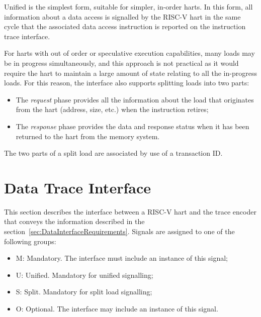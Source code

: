 Unified is the simplest form, suitable for simpler, in-order harts.  In this form, all
information about a data access is signalled by the RISC-V hart in the
same cycle that the associated data access instruction is reported on the instruction
trace interface.  

For harts with out of order or speculative execution capabilities, many loads may be in 
progress simultaneously, and this approach is not practical as it would require the hart 
to maintain a large amount of state relating to all the in-progress loads.  For this 
reason, the interface also supports splitting loads into two parts:

\begin{itemize}
  \item The \textit{request} phase provides all the information about the load that
    originates from the hart (address, size, etc.) when the instruction retires;
  \item The \textit{response} phase provides the data and response status when it has
    been returned to the hart from the memory system.
\end{itemize}

The two parts of a split load are associated by use of a transaction ID.

\section{Data Trace Interface}\label{sec:DataTraceInterface}

This section describes the interface between a RISC-V hart and the
trace encoder that conveys the information described in the
section~\ref{sec:DataInterfaceRequirements}.  Signals are assigned to
one of the following groups:

\begin{itemize}
  \item M: Mandatory.  The interface must include an instance of this signal;
  \item U: Unified.  Mandatory for unified signalling;
  \item S: Split.  Mandatory for split load signalling;
  \item O: Optional.  The interface may include an instance of this signal.
\end{itemize}

